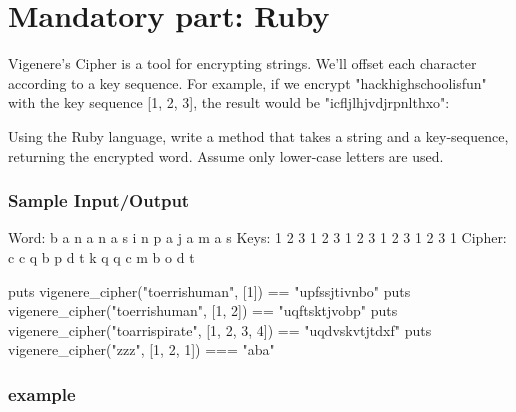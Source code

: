 \documentclass{42-en}
\begin{document}

\chapter{Mandatory part: Ruby}

    Vigenere's Cipher is a tool for encrypting strings. We'll offset each character
    according to a key sequence. For example, if we encrypt "hackhighschoolisfun" with the
    key sequence [1, 2, 3], the result would be "icfljlhjvdjrpnlthxo":

    Using the Ruby language, write a method that takes a string and a key-sequence, returning the encrypted word. Assume only lower-case letters are used.

    \subsection{Sample Input/Output}

           \begin{42console}
            Word:   b a n a n a s i n p a j a m a s
            Keys:   1 2 3 1 2 3 1 2 3 1 2 3 1 2 3 1
            Cipher: c c q b p d t k q q c m b o d t
            \end{42console}

             \begin{42console}
            puts vigenere_cipher("toerrishuman", [1]) == "upfssjtivnbo"
            puts vigenere_cipher("toerrishuman", [1, 2]) == "uqftsktjvobp"
            puts vigenere_cipher("toarrispirate", [1, 2, 3, 4]) == "uqdvskvtjtdxf"
            puts vigenere_cipher("zzz", [1, 2, 1]) === "aba"
            \end{42console}

    \subsection{example}
\end{document}
